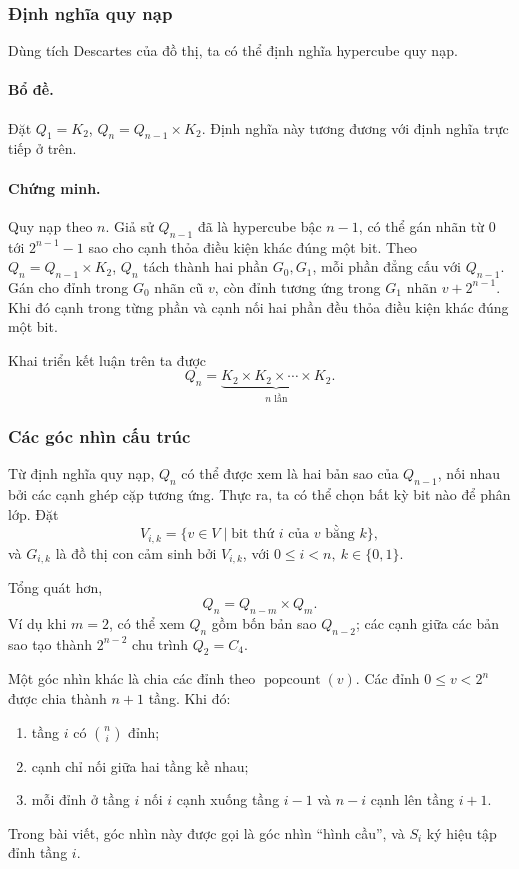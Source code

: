 \documentclass[11pt]{article}
\begin{document}
\subsubsection{Định nghĩa quy nạp}

Dùng tích Descartes của đồ thị, ta có thể định nghĩa hypercube quy nạp.

\paragraph{Bổ đề.}
Đặt \(Q_1=K_2\), \(Q_n=Q_{n-1}\times K_2\). Định nghĩa này tương đương với định
nghĩa trực tiếp ở trên.

\paragraph{Chứng minh.}
Quy nạp theo \(n\). Giả sử \(Q_{n-1}\) đã là hypercube bậc \(n-1\), có thể gán
nhãn từ \(0\) tới \(2^{n-1}-1\) sao cho cạnh thỏa điều kiện khác đúng một bit.
Theo \(Q_n=Q_{n-1}\times K_2\), \(Q_n\) tách thành hai phần \(G_0,G_1\), mỗi
phần đẳng cấu với \(Q_{n-1}\). Gán cho đỉnh trong \(G_0\) nhãn cũ \(v\), còn
đỉnh tương ứng trong \(G_1\) nhãn \(v+2^{n-1}\). Khi đó cạnh trong từng phần và
cạnh nối hai phần đều thỏa điều kiện khác đúng một bit.

Khai triển kết luận trên ta được
\[
  Q_n=\underbrace{K_2\times K_2\times\cdots\times K_2}_{n\text{ lần}}.
\]

\subsubsection{Các góc nhìn cấu trúc}

Từ định nghĩa quy nạp, \(Q_n\) có thể được xem là hai bản sao của
\(Q_{n-1}\), nối nhau bởi các cạnh ghép cặp tương ứng. Thực ra, ta có thể chọn
bất kỳ bit nào để phân lớp. Đặt
\[
  V_{i,k}=\{v\in V\mid \text{bit thứ }i\text{ của }v\text{ bằng }k\},
\]
và \(G_{i,k}\) là đồ thị con cảm sinh bởi \(V_{i,k}\), với
\(0\le i<n,\ k\in\{0,1\}\).

Tổng quát hơn,
\[
  Q_n=Q_{n-m}\times Q_m.
\]
Ví dụ khi \(m=2\), có thể xem \(Q_n\) gồm bốn bản sao \(Q_{n-2}\); các cạnh
giữa các bản sao tạo thành \(2^{n-2}\) chu trình \(Q_2=C_4\).

Một góc nhìn khác là chia các đỉnh theo \(\operatorname{popcount}(v)\). Các
đỉnh \(0\le v<2^n\) được chia thành \(n+1\) tầng. Khi đó:
\begin{enumerate}
  \item tầng \(i\) có \(\binom ni\) đỉnh;
  \item cạnh chỉ nối giữa hai tầng kề nhau;
  \item mỗi đỉnh ở tầng \(i\) nối \(i\) cạnh xuống tầng \(i-1\) và \(n-i\)
  cạnh lên tầng \(i+1\).
\end{enumerate}
Trong bài viết, góc nhìn này được gọi là góc nhìn ``hình cầu'', và \(S_i\) ký
hiệu tập đỉnh tầng \(i\).
\end{document}
